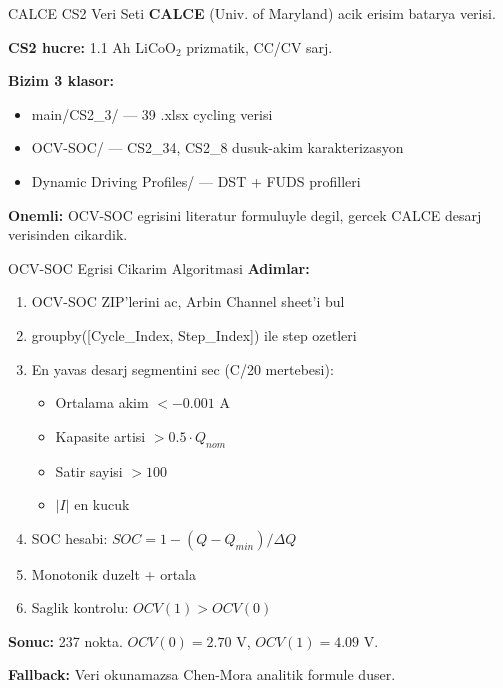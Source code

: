 \documentclass[10pt,aspectratio=169]{beamer}
\begin{document}
\begin{frame}{CALCE CS2 Veri Seti}
\textbf{CALCE} (Univ. of Maryland) acik erisim batarya verisi.

\textbf{CS2 hucre:} 1.1 Ah LiCoO$_2$ prizmatik, CC/CV sarj.

\vspace{0.3em}
\textbf{Bizim 3 klasor:}
\begin{itemize}\footnotesize
  \item main/CS2\_3/ --- 39 .xlsx cycling verisi
  \item OCV-SOC/ --- CS2\_34, CS2\_8 dusuk-akim karakterizasyon
  \item Dynamic Driving Profiles/ --- DST + FUDS profilleri
\end{itemize}

\vspace{0.3em}
\begin{tcolorbox}[colback=blue!4,colframe=blue!50!black,boxrule=0.4pt]
\textbf{Onemli:} OCV-SOC egrisini literatur formuluyle degil, gercek CALCE desarj verisinden cikardik.
\end{tcolorbox}
\end{frame}

\begin{frame}{OCV-SOC Egrisi Cikarim Algoritmasi}
\textbf{Adimlar:}
\begin{enumerate}\footnotesize
  \item OCV-SOC ZIP'lerini ac, Arbin Channel sheet'i bul
  \item groupby([Cycle\_Index, Step\_Index]) ile step ozetleri
  \item En yavas desarj segmentini sec (C/20 mertebesi):
    \begin{itemize}
      \item Ortalama akim $< -0.001$ A
      \item Kapasite artisi $> 0.5 \cdot Q_{nom}$
      \item Satir sayisi $> 100$
      \item $|I|$ en kucuk
    \end{itemize}
  \item SOC hesabi: $SOC = 1 - (Q - Q_{min})/\Delta Q$
  \item Monotonik duzelt + ortala
  \item Saglik kontrolu: $OCV(1) > OCV(0)$
\end{enumerate}

\vspace{0.3em}
\textbf{Sonuc:} 237 nokta. $OCV(0) = 2.70$ V, $OCV(1) = 4.09$ V.

\textbf{Fallback:} Veri okunamazsa Chen-Mora analitik formule duser.
\end{frame}
\end{document}
